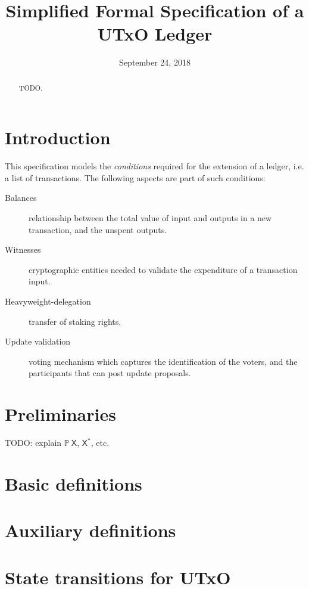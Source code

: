 \documentclass[11pt,a4paper]{article}
\newcommand{\powerset}[1]{\mathbb{P}~#1}
\newcommand{\type}[1]{\mathsf{#1}}
\newcommand{\seqof}[1]{#1^{*}}
\begin{document}
\title{Simplified Formal Specification of a UTxO Ledger}

\author{}

\date{September 24, 2018}

\begin{abstract}
TODO.
\end{abstract}

\section{Introduction}
\label{sec:introduction}

This specification models the \textit{conditions} required for the extension of
a ledger, i.e. a list of transactions. The following aspects are part of such
conditions:

\begin{description}
\item[Balances] relationship between the total value of input and outputs
  in a new transaction, and the unspent outputs.
\item[Witnesses] cryptographic entities needed to validate the expenditure
  of a transaction input.
\item[Heavyweight-delegation] transfer of staking rights.
\item[Update validation] voting mechanism which captures the identification of
  the voters, and the participants that can post update proposals.
\end{description}

\section{Preliminaries}\label{sec:preliminaries}

TODO: explain  $\powerset{\type{X}}$, $\seqof{\type{X}}$, etc.


\section{Basic definitions}
\label{sec:basic-definitions}

\section{Auxiliary definitions}
\label{sec:auxil-defin}

\section{State transitions for UTxO}
\label{sec:state-trans-utxo-1}
\end{document}

